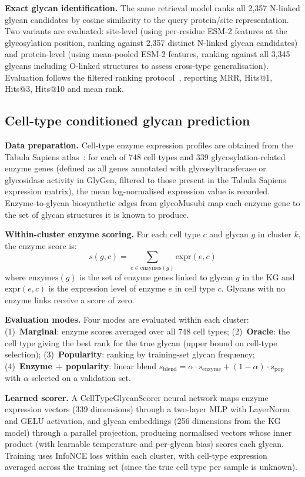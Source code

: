 \documentclass[11pt,a4paper]{article}
\begin{document}
\textbf{Exact glycan identification.} The same retrieval model ranks all 2,357
N-linked glycan candidates by cosine similarity to the query protein/site
representation. Two variants are evaluated:
site-level (using per-residue ESM-2 features at the glycosylation position,
ranking against 2,357 distinct N-linked glycan candidates) and protein-level
(using mean-pooled ESM-2 features, ranking against all 3,345 glycans including
O-linked structures to assess cross-type generalisation). Evaluation follows the filtered ranking
protocol~\cite{bordes2013}, reporting MRR, Hits@1, Hits@3, Hits@10 and mean
rank.

\subsection{Cell-type conditioned glycan prediction}

\textbf{Data preparation.} Cell-type enzyme expression profiles are obtained
from the Tabula Sapiens atlas~\cite{tabulasapiens2022}: for each of 748 cell
types and 339 glycosylation-related enzyme genes (defined as all genes annotated
with glycosyltransferase or glycosidase activity in GlyGen, filtered to those
present in the Tabula Sapiens expression matrix), the mean log-normalised
expression value is recorded. Enzyme-to-glycan biosynthetic edges from glycoMusubi
map each enzyme gene to the set of glycan structures it is known to produce.

\textbf{Within-cluster enzyme scoring.} For each cell type $c$ and glycan $g$ in
cluster $k$, the enzyme score is:
\begin{equation}
s(g, c) = \sum_{e \in \text{enzymes}(g)} \text{expr}(e, c)
\end{equation}
where $\text{enzymes}(g)$ is the set of enzyme genes linked to glycan $g$ in the
KG and $\text{expr}(e, c)$ is the expression level of enzyme $e$ in cell type
$c$. Glycans with no enzyme links receive a score of zero.

\textbf{Evaluation modes.} Four modes are evaluated within each cluster:
(1)~\textbf{Marginal}: enzyme scores averaged over all 748 cell types;
(2)~\textbf{Oracle}: the cell type giving the best rank for the true glycan
(upper bound on cell-type selection);
(3)~\textbf{Popularity}: ranking by training-set glycan frequency;
(4)~\textbf{Enzyme + popularity}: linear blend
$s_{\text{blend}} = \alpha \cdot s_{\text{enzyme}} + (1 - \alpha) \cdot s_{\text{pop}}$
with $\alpha$ selected on a validation set.

\textbf{Learned scorer.} A CellTypeGlycanScorer neural network maps enzyme
expression vectors (339 dimensions) through a two-layer MLP with LayerNorm and
GELU activation, and glycan embeddings (256 dimensions from the KG model)
through a parallel projection, producing normalised vectors whose inner product
(with learnable temperature and per-glycan bias) scores each glycan. Training
uses InfoNCE loss within each cluster, with cell-type expression averaged across
the training set (since the true cell type per sample is unknown).
\end{document}
